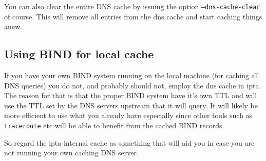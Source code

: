 \documentclass[english,twoside,openright,a4paper,12pt]{article}
\begin{document}
You can also clear the entire DNS cache by issuing the option
\texttt{--dns-cache-clear} of course. This will remove all entries
from the dns cache and start caching things anew.

\subsection{Using BIND for local cache}

If you have your own BIND system running on the local machine (for
caching all DNS queries) you do not, and probably should not, employ
the dns cache in ipta. The reason for that is that the proper BIND
system have it's own TTL and will use the TTL set by the DNS servers
upstream that it will query. It will likely be more efficient to use
what you already have especially since other tools such as
\texttt{traceroute} etc will be able to benefit from the cached BIND
records.

So regard the ipta internal cache as something that will aid you in
case you are not running your own caching DNS server.
\end{document}
